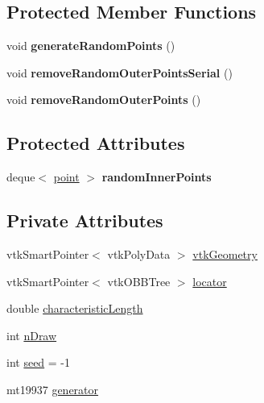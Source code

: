 \subsection*{Protected Member Functions}
\begin{DoxyCompactItemize}
\item 
void {\bfseries generate\+Random\+Points} ()\hypertarget{class_simple_domain2_d_aeeb59155f6dec3e57e515c4b3a703e08}{}\label{class_simple_domain2_d_aeeb59155f6dec3e57e515c4b3a703e08}

\item 
void {\bfseries remove\+Random\+Outer\+Points\+Serial} ()\hypertarget{class_simple_domain2_d_af1cab33fce288f46723cb7860f7ed8bb}{}\label{class_simple_domain2_d_af1cab33fce288f46723cb7860f7ed8bb}

\item 
void {\bfseries remove\+Random\+Outer\+Points} ()\hypertarget{class_simple_domain2_d_af4f587398d458be9dfb09e47abfc3ad9}{}\label{class_simple_domain2_d_af4f587398d458be9dfb09e47abfc3ad9}

\end{DoxyCompactItemize}
\subsection*{Protected Attributes}
\begin{DoxyCompactItemize}
\item 
deque$<$ \hyperlink{structpoint}{point} $>$ {\bfseries random\+Inner\+Points}\hypertarget{class_simple_domain2_d_a3baccded48c6c2d227c86938639c7e3b}{}\label{class_simple_domain2_d_a3baccded48c6c2d227c86938639c7e3b}

\end{DoxyCompactItemize}
\subsection*{Private Attributes}
\begin{DoxyCompactItemize}
\item 
vtk\+Smart\+Pointer$<$ vtk\+Poly\+Data $>$ \hyperlink{class_simple_domain2_d_a2acccf092aaaccfc4fabcd7668a4cc32}{vtk\+Geometry}
\item 
vtk\+Smart\+Pointer$<$ vtk\+O\+B\+B\+Tree $>$ \hyperlink{class_simple_domain2_d_a663886e5e4f47a4d1cec260c93b2498b}{locator}
\item 
double \hyperlink{class_simple_domain2_d_a3504bd60c2e2585bd28f9bac63e6eee7}{characteristic\+Length}
\item 
int \hyperlink{class_simple_domain2_d_ad541f350ae7423116545f4363f8d0715}{n\+Draw}
\item 
int \hyperlink{class_simple_domain2_d_abca10a88602d74c02d5d94651d9fc8bd}{seed} = -\/1
\item 
mt19937 \hyperlink{class_simple_domain2_d_a752e854a584a9bc6476903d639d8c0ed}{generator}
\end{DoxyCompactItemize}


